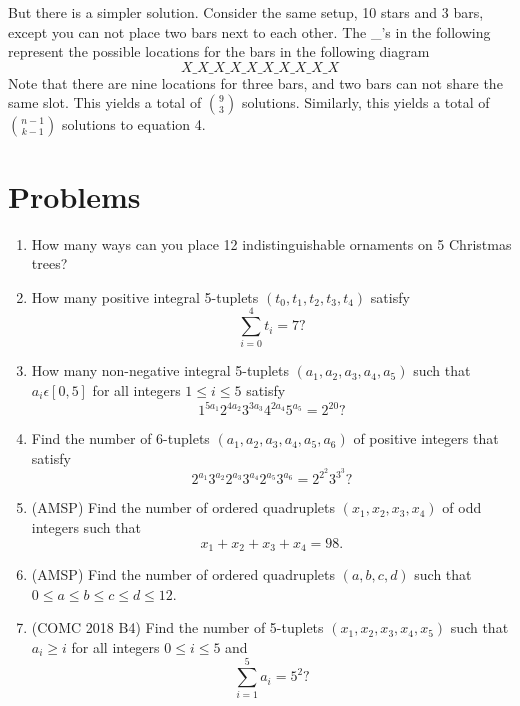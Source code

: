 \documentclass[11pt]{article}
\begin{document}
    But there is a simpler solution. Consider the same setup, 10 stars and 3 bars, except you can not place two bars next to each other. The \_'s in the following represent the possible locations for the bars in the following diagram
    \begin{equation}
        X\_X\_X\_X\_X\_X\_X\_X\_X\_X
    \end{equation}
    Note that there are nine locations for three bars, and two bars can not share the same slot. This yields a total of $\binom{9}{3}$ solutions. Similarly, this yields a total of $\binom{n-1}{k-1}$ solutions to equation 4.
    \section{Problems}
    \begin{enumerate}
        \item How many ways can you place 12 indistinguishable ornaments on 5 Christmas trees?
        \item How many positive integral 5-tuplets $(t_0,t_1,t_2,t_3,t_4)$ satisfy $$\sum_{i=0}^4t_i=7?$$
        \item How many non-negative integral 5-tuplets $(a_1,a_2,a_3,a_4,a_5)$ such that $a_i\epsilon [0,5]$ for all integers $1\leq i\leq 5$ satisfy $$1^{5a_1}2^{4a_2}3^{3a_3}4^{2a_4}5^{a_5}=2^{20}?$$
        \item Find the number of 6-tuplets $(a_1,a_2,a_3,a_4,a_5,a_6)$ of positive integers that satisfy $$2^{a_1}3^{a_2}2^{a_3}3^{a_4}2^{a_5}3^{a_6}=2^{2^2}3^{3^3}?$$
        \item (AMSP) Find the number of ordered quadruplets $(x_1,x_2,x_3,x_4)$ of odd integers such that $$x_1+x_2+x_3+x_4=98.$$
        \item (AMSP) Find the number of ordered quadruplets $(a,b,c,d)$ such that $0\leq a\leq b\leq c\leq d \leq12$.
        \item (COMC 2018 B4) Find the number of 5-tuplets $(x_1,x_2,x_3,x_4,x_5)$ such that $a_i\geq i$ for all integers $0\leq i\leq 5$ and $$\sum_{i=1}^5 a_i=5^2?$$
    \end{enumerate}
\end{document}
